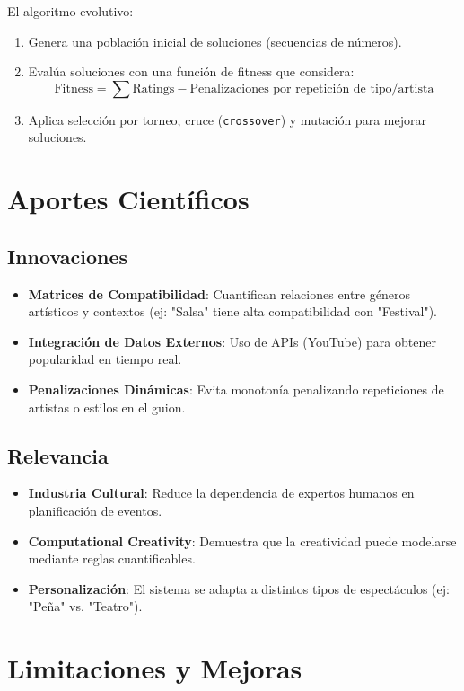 \documentclass{article}
\begin{document}
El algoritmo evolutivo:
\begin{enumerate}
    \item Genera una población inicial de soluciones (secuencias de números).
    \item Evalúa soluciones con una función de fitness que considera:
    \[
    \text{Fitness} = \sum \text{Ratings} - \text{Penalizaciones por repetición de tipo/artista}
    \]
    \item Aplica selección por torneo, cruce (\texttt{crossover}) y mutación para mejorar soluciones.
\end{enumerate}

\section{Aportes Científicos}

\subsection{Innovaciones}
\begin{itemize}
    \item \textbf{Matrices de Compatibilidad}: Cuantifican relaciones entre géneros artísticos y contextos (ej: "Salsa" tiene alta compatibilidad con "Festival").
    \item \textbf{Integración de Datos Externos}: Uso de APIs (YouTube) para obtener popularidad en tiempo real.
    \item \textbf{Penalizaciones Dinámicas}: Evita monotonía penalizando repeticiones de artistas o estilos en el guion.
\end{itemize}

\subsection{Relevancia}
\begin{itemize}
    \item \textbf{Industria Cultural}: Reduce la dependencia de expertos humanos en planificación de eventos.
    \item \textbf{Computational Creativity}: Demuestra que la creatividad puede modelarse mediante reglas cuantificables.
    \item \textbf{Personalización}: El sistema se adapta a distintos tipos de espectáculos (ej: "Peña" vs. "Teatro").
\end{itemize}

\section{Limitaciones y Mejoras}
\end{document}
